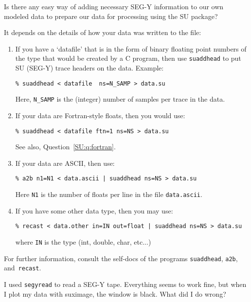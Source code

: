 {{{{{{{\begin{question}
Is there any easy way of adding necessary 
{\sf SEG-Y} information to our own modeled data to prepare
our data for processing using the {\small\sf SU} package?
\end{question}

\begin{rmans}
It depends on the details of how your data was written to the file:
\begin{enumerate}
\item If you have a `datafile'
that is in the form of binary floating point numbers of the type
that would be created by a C program, then use {\tt suaddhead} to
put {\small\sf SU} ({\sf SEG-Y}) trace headers on the data. Example:
{\small \begin{verbatim}
% suaddhead < datafile  ns=N_SAMP > data.su
\end{verbatim}}\noindent
Here, \verb:N_SAMP: is the (integer) number of samples per
trace in the data.

\item If your data are Fortran-style floats, then you would use:
{\small \begin{verbatim}
% suaddhead < datafile ftn=1 ns=NS > data.su
\end{verbatim}}\noindent
See also, Question~\ref{SU:q:fortran}.

\item If your data are {\sf ASCII}, then use:
{\small \begin{verbatim}
% a2b n1=N1 < data.ascii | suaddhead ns=NS > data.su
\end{verbatim}}\noindent
Here \verb:N1: is the number of floats per line in the file
{\tt data.ascii}.

\item If you have some other data type, then you may use:
{\small \begin{verbatim}
% recast < data.other in=IN out=float | suaddhead ns=NS > data.su
\end{verbatim}}\noindent
where \verb:IN: is the type (int, double, char, etc...) 
\end{enumerate}

\noindent
For further information, consult the self-docs of the programs
{\tt suaddhead}, {\tt a2b}, and~{\tt recast}.
\end{rmans}

\begin{question}
\label{SU:q:segyclean}
I used {\tt segyread} to read a {\sf SEG-Y} tape.
Everything seems to work fine,
but when I plot my data with suximage, the window is black.
What did I do wrong?
\end{question}

}}}}}}}
